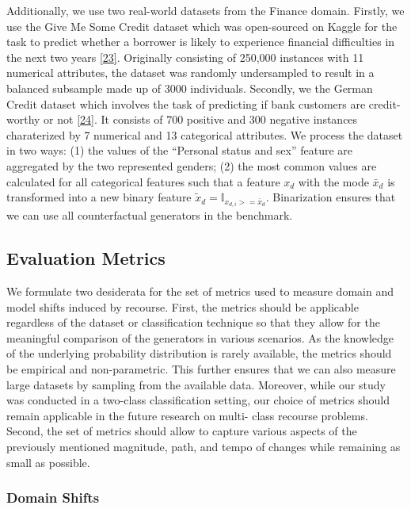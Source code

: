 \documentclass[
  conference]{IEEEtran}
\begin{document}
Additionally, we use two real-world datasets from the Finance domain.
Firstly, we use the Give Me Some Credit dataset which was open-sourced
on Kaggle for the task to predict whether a borrower is likely to
experience financial difficulties in the next two years
\protect\hyperlink{ref-gmsc_data}{{[}23{]}}. Originally consisting of
250,000 instances with 11 numerical attributes, the dataset was randomly
undersampled to result in a balanced subsample made up of 3000
individuals. Secondly, we the German Credit dataset which involves the
task of predicting if bank customers are credit-worthy or not
\protect\hyperlink{ref-germancredit1994}{{[}24{]}}. It consists of 700
positive and 300 negative instances charaterized by 7 numerical and 13
categorical attributes. We process the dataset in two ways: (1) the
values of the ``Personal status and sex'' feature are aggregated by the
two represented genders; (2) the most common values are calculated for
all categorical features such that a feature \(x_d\) with the mode
\(\bar{x}_d\) is transformed into a new binary feature
\(\tilde{x}_d=\mathbb{I}_{x_{d,i}>=\bar{x}_d}\). Binarization ensures
that we can use all counterfactual generators in the benchmark.

\hypertarget{sec-method-metrics}{%
\subsection{Evaluation Metrics}\label{sec-method-metrics}}

We formulate two desiderata for the set of metrics used to measure
domain and model shifts induced by recourse. First, the metrics should
be applicable regardless of the dataset or classification technique so
that they allow for the meaningful comparison of the generators in
various scenarios. As the knowledge of the underlying probability
distribution is rarely available, the metrics should be empirical and
non-parametric. This further ensures that we can also measure large
datasets by sampling from the available data. Moreover, while our study
was conducted in a two-class classification setting, our choice of
metrics should remain applicable in the future research on multi- class
recourse problems. Second, the set of metrics should allow to capture
various aspects of the previously mentioned magnitude, path, and tempo
of changes while remaining as small as possible.

\hypertarget{domain-shifts}{%
\subsubsection{Domain Shifts}\label{domain-shifts}}
\end{document}
